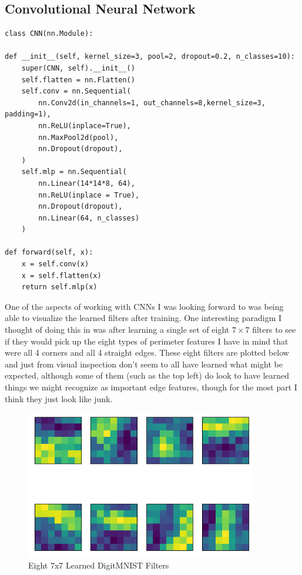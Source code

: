 \documentclass[12pt, twoside]{report}
\begin{document}
\subsection{Convolutional Neural Network}

\begin{lstlisting}[style=Python,caption=CNN,label=lst:python]
class CNN(nn.Module):

def __init__(self, kernel_size=3, pool=2, dropout=0.2, n_classes=10):
    super(CNN, self).__init__()
    self.flatten = nn.Flatten()
    self.conv = nn.Sequential(
        nn.Conv2d(in_channels=1, out_channels=8,kernel_size=3, padding=1),
        nn.ReLU(inplace=True),
        nn.MaxPool2d(pool),
        nn.Dropout(dropout),
    )
    self.mlp = nn.Sequential(
        nn.Linear(14*14*8, 64),
        nn.ReLU(inplace = True),
        nn.Dropout(dropout),
        nn.Linear(64, n_classes)
    )
    
def forward(self, x):
    x = self.conv(x)
    x = self.flatten(x)
    return self.mlp(x)
\end{lstlisting}

One of the aspects of working with CNNs I was looking forward to was being able to visualize
the learned filters after training. One interesting paradigm I thought of doing this in was 
after learning a single set of eight $7 \times 7$ filters to see if they would pick up the 
eight types of perimeter features I have in mind that were all 4 corners and all 4 straight edges.
These eight filters are plotted below and just from visual inspection don't seem to all have learned what
might be expected, although some of them (such as the top left) do look to have learned things we might
recognize as important edge features, though for the most part I think they just look like junk.

\begin{figure}[H]
    \centering
    \includegraphics[width=0.9\textwidth]{figures/8filters77.png}
    \caption*{Eight 7x7 Learned DigitMNIST Filters}
\end{figure}
\end{document}
